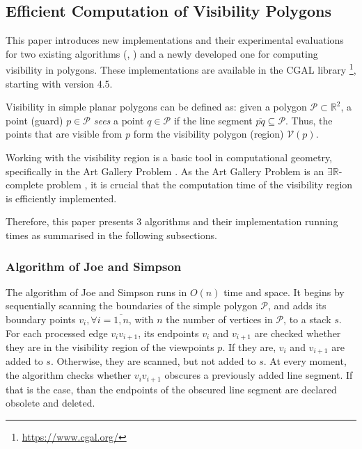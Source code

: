 \subsection{Efficient Computation of Visibility Polygons}
This paper \cite{DBLP:journals/corr/BungiuHHHK14} introduces new implementations and their experimental evaluations for two existing algorithms (\cite{joe1987corrections}, \cite{asano1985efficient}) and a newly developed one for computing visibility in polygons. These implementations are available in the CGAL library \footnote{\url{https://www.cgal.org/}}, starting with version 4.5.

Visibility in simple planar polygons can be defined as: given a polygon $\mathcal P \subset \mathbb R^2$, a point (guard) $p \in \mathcal P$ \textit{sees} a point $q \in \mathcal P$ if the line segment $\overline{pq} \subseteq \mathcal P$. Thus, the points that are visible from $p$ form the visibility polygon (region) $\mathcal V(p)$.

Working with the visibility region is a basic tool in computational geometry, specifically in the Art Gallery Problem \cite{o1987art}. As the Art Gallery Problem \cite{o1987art} is an $\exists \mathbb R$-complete problem \cite{abrahamsen2021art}, it is crucial that the computation time of the visibility region is efficiently implemented. 

Therefore, this paper presents 3 algorithms and their implementation running times as summarised in the following subsections.

\subsubsection{Algorithm of Joe and Simpson \cite{joe1987corrections}}
The algorithm of Joe and Simpson \cite{joe1987corrections} runs in $O(n)$ time and space. It begins by sequentially scanning the boundaries of the simple polygon $\mathcal P$, and adds its boundary points $v_i, \forall i = \overline{1, n}$, with $n$ the number of vertices in $\mathcal P$, to a stack $s$. For each processed edge $v_iv_{i + 1}$, its endpoints $v_i$ and $v_{i + 1}$ are checked whether they are in the visibility region of the viewpoints $p$. If they are, $v_i$ and $v_{i + 1}$ are added to $s$. Otherwise, they are scanned, but not added to $s$. At every moment, the algorithm checks whether $v_iv_{i + 1}$ obscures a previously added line segment. If that is the case, than the endpoints of the obscured line segment are declared obsolete and deleted. 

